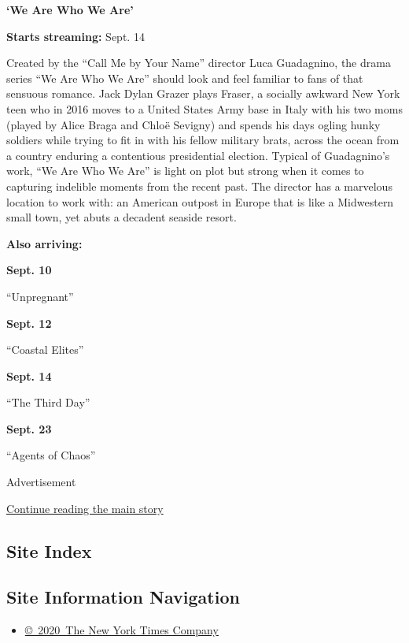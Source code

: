 \textbf{`We Are Who We Are'}

\textbf{Starts streaming:} Sept. 14

Created by the ``Call Me by Your Name'' director Luca Guadagnino, the
drama series ``We Are Who We Are'' should look and feel familiar to fans
of that sensuous romance. Jack Dylan Grazer plays Fraser, a socially
awkward New York teen who in 2016 moves to a United States Army base in
Italy with his two moms (played by Alice Braga and Chloë Sevigny) and
spends his days ogling hunky soldiers while trying to fit in with his
fellow military brats, across the ocean from a country enduring a
contentious presidential election. Typical of Guadagnino's work, ``We
Are Who We Are'' is light on plot but strong when it comes to capturing
indelible moments from the recent past. The director has a marvelous
location to work with: an American outpost in Europe that is like a
Midwestern small town, yet abuts a decadent seaside resort.

\textbf{Also arriving:}

\textbf{Sept. 10}

``Unpregnant''

\textbf{Sept. 12}

``Coastal Elites''

\textbf{Sept. 14}

``The Third Day''

\textbf{Sept. 23}

``Agents of Chaos''

Advertisement

\protect\hyperlink{after-bottom}{Continue reading the main story}

\hypertarget{site-index}{%
\subsection{Site Index}\label{site-index}}

\hypertarget{site-information-navigation}{%
\subsection{Site Information
Navigation}\label{site-information-navigation}}

\begin{itemize}
\tightlist
\item
  \href{https://help.nytimes3xbfgragh.onion/hc/en-us/articles/115014792127-Copyright-notice}{©~2020~The
  New York Times Company}
\end{itemize}

